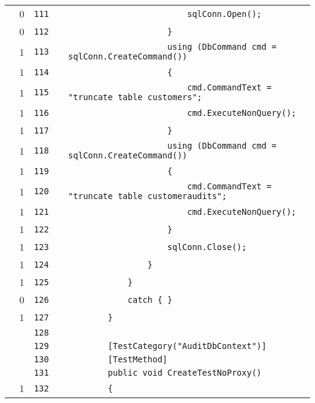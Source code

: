 \documentclass[a4paper,10pt]{article}
\begin{document}
\begin{longtable}[l]{lrrll}
\cellcolor{red} & 0 & \verb~111~ & & \verb~                        sqlConn.Open();~\\
\cellcolor{red} & 0 & \verb~112~ & & \verb~                    }~\\
\cellcolor{green} & 1 & \verb~113~ & & \verb~                    using (DbCommand cmd = sqlConn.CreateCommand())~\\
\cellcolor{green} & 1 & \verb~114~ & & \verb~                    {~\\
\cellcolor{green} & 1 & \verb~115~ & & \verb~                        cmd.CommandText = "truncate table customers";~\\
\cellcolor{green} & 1 & \verb~116~ & & \verb~                        cmd.ExecuteNonQuery();~\\
\cellcolor{green} & 1 & \verb~117~ & & \verb~                    }~\\
\cellcolor{green} & 1 & \verb~118~ & & \verb~                    using (DbCommand cmd = sqlConn.CreateCommand())~\\
\cellcolor{green} & 1 & \verb~119~ & & \verb~                    {~\\
\cellcolor{green} & 1 & \verb~120~ & & \verb~                        cmd.CommandText = "truncate table customeraudits";~\\
\cellcolor{green} & 1 & \verb~121~ & & \verb~                        cmd.ExecuteNonQuery();~\\
\cellcolor{green} & 1 & \verb~122~ & & \verb~                    }~\\
\cellcolor{green} & 1 & \verb~123~ & & \verb~                    sqlConn.Close();~\\
\cellcolor{green} & 1 & \verb~124~ & & \verb~                }~\\
\cellcolor{green} & 1 & \verb~125~ & & \verb~            }~\\
\cellcolor{red} & 0 & \verb~126~ & & \verb~            catch { }~\\
\cellcolor{green} & 1 & \verb~127~ & & \verb~        }~\\
\cellcolor{gray} &  & \verb~128~ & & \verb~~\\
\cellcolor{gray} &  & \verb~129~ & & \verb~        [TestCategory("AuditDbContext")]~\\
\cellcolor{gray} &  & \verb~130~ & & \verb~        [TestMethod]~\\
\cellcolor{gray} &  & \verb~131~ & & \verb~        public void CreateTestNoProxy()~\\
\cellcolor{green} & 1 & \verb~132~ & & \verb~        {~\\

\end{longtable}
\end{document}
